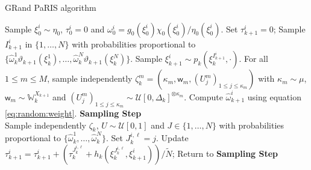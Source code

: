 \documentclass[12pt]{article}
\newcommand{\eqsp}{\;}
\newcommand{\1}{\mathrm{1}}
\newcommand{\qk}{q_{k}}
\newcommand{\mw}{\mathsf{w}}%
\begin{document}
\begin{algorithm}
\caption{GRand PaRIS algorithm}
\begin{algorithmic}
\STATE Sample $\xi_0^i \sim\eta_0$, $\tau_0^i = 0$  and  $\omega_0^i = g_0(\xi_0^i)\chi_0(\xi_0^i)/\eta_0(\xi_0^i)$.
\ENDFOR
{}
\STATE Set $\tau_{k+1}^i=0$;
\STATE Sample $I_{k+1}^{i}$ in $\{1,\ldots,N\}$ with probabilities proportional to $\{\widehat{\omega}_{k}^1\vartheta_{k+1}(\xi_{k}^1),\dots,\widehat{\omega}_{k}^N\vartheta_{k+1}(\xi_{k}^N)\}$.
\STATE Sample $\xi_{k+1}^{i} \sim p_k(\xi_{k}^{I_{k+1}^{i}},\cdot)$.
\STATE For all $1\le m\le M$, sample independently $\zeta_k^m=(\kappa_m,\mw_m, (U_j^m)_{1\leq j\leq \kappa_m})$ with $\kappa_m\sim \mu$, $\mw_m\sim \mathbb{W}_k^{X_{k+1}}$ and $(U_j^m)_{1\leq j\leq \kappa_m}\sim \mathcal{U}[0,\Delta_k]^{\otimes \kappa_m}$.
\STATE Compute $\widehat{\omega}^{i}_{k+1}$ using equation \eqref{eq:random:weight}.
\STATE \textbf{\sc Sampling Step} \\
Sample independently $\zeta_k$, $U\sim \mathcal{U}[0,1]$ and $J\in\{1,\ldots,N\}$ with probabilities proportional to  $\{\widehat{\omega}_{k}^1,\dots,\widehat{\omega}_{k}^N\}$.
\IF{ $$U \leq \frac{\widehat{\qk}(\xi_{k}^J,\xi_{k+1}^i,\zeta_k)}{\hat{\sigma}^k_+},$$}
\STATE Set $J_k^{i,\ell} = j$.
\STATE Update $\tau_{k+1}^i = \tau_{k+1}^i + \left(\tau^{J_k^{i,\ell}}_{k} + h_k(\xi^{J_k^{i,\ell}}_{k},\xi^i_{k+1})\right)/\tilde{N}$;
\ELSE 
\STATE Return to \textbf{\sc Sampling Step}
\ENDIF
\ENDFOR
\ENDFOR
\ENDFOR
\end{algorithmic}
\label{alg:Ozaki:PaRIS}
\end{algorithm}
\end{document}
